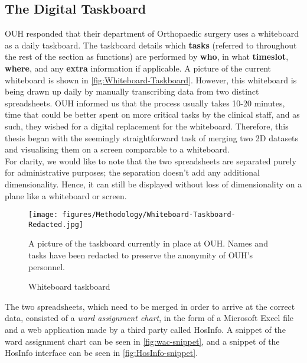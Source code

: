 \subsection{The Digital Taskboard}
OUH responded that their department of Orthopaedic surgery uses a whiteboard as a daily taskboard. The taskboard details which \textbf{tasks} (referred to throughout the rest of the section as \gls{functions}) are performed by \textbf{who}, in what \textbf{timeslot}, \textbf{where}, and any \textbf{extra} information if applicable. A picture of the current whiteboard is shown in \autoref{fig:Whiteboard-Taskboard}. However, this whiteboard is being drawn up daily by manually transcribing data from two distinct spreadsheets. OUH  informed us that the process usually takes 10-20 minutes, time that could be better spent on more critical tasks by the clinical staff, and as such, they wished for a digital replacement for the whiteboard. Therefore, this thesis began with the seemingly straightforward task of merging two 2D datasets and visualising them on a screen comparable to a whiteboard.
\\
For clarity, we would like to note that the two spreadsheets are separated purely for administrative purposes; the separation doesn't add any additional dimensionality. Hence, it can still be displayed without loss of dimensionality on a plane like a whiteboard or screen. 

\begin{figure}[H]
    \centering
    \texttt{[image: figures/Methodology/Whiteboard-Taskboard-Redacted.jpg]}
    \caption{Whiteboard taskboard}
    \small
    \raggedright 
    A picture of the taskboard currently in place at OUH. Names and tasks have been redacted to preserve the anonymity of OUH's personnel. 
    \label{fig:Whiteboard-Taskboard}
\end{figure}

The two spreadsheets, which need to be merged in order to arrive at the correct data, consisted of a \emph{ward assignment chart}, in the form of a Microsoft Excel file and a web application made by a third party called HosInfo. A snippet of the ward assignment chart can be seen in \autoref{fig:wac-snippet}, and a snippet of the HosInfo interface can be seen in \autoref{fig:HosInfo-snippet}.

